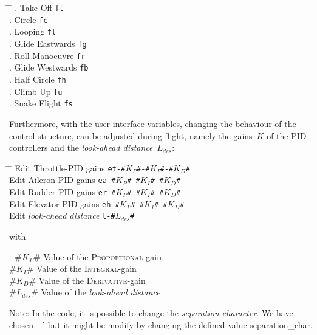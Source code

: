\documentclass[11pt,a4paper]{scrartcl}		%
\begin{document}
\begin{tabbing}
	\hspace{2cm} \= \hspace{4cm} \= \hspace{3cm} \kill
	. Take Off \> \texttt{ft} \\	
	. Circle \> \texttt{fc} \\	
	. Looping\> \texttt{fl} \\	
	. Glide Eastwards \> \texttt{fg} \\
	. Roll Manoeuvre \> \texttt{fr} \\		
	. Glide Westwards \> \texttt{fb} \\	
	. Half Circle \> \texttt{fh} \\	
	. Climb Up \> \texttt{fu} \\	
	. Snake Flight \> \texttt{fs} \\		
\end{tabbing}



\medskip

Furthermore, with the user interface variables, changing the behaviour of the control structure, can be adjusted during flight, namely the gains~$K$ of the PID-controllers and the \textsl{look-ahead distance}~$L_{des}$:

\begin{tabbing}
	\hspace{2cm} \= \hspace{6cm} \= \hspace{7cm} \kill
	\> Edit Throttle-PID gains \> \texttt{et-\#$K_P$\#-\#$K_I$\#-\#$K_D$\#} \\
	\> Edit Aileron-PID gains \> \texttt{ea-\#$K_P$\#-\#$K_I$\#-\#$K_D$\#} \\
	\> Edit Rudder-PID gains \> \texttt{er-\#$K_P$\#-\#$K_I$\#-\#$K_D$\#} \\
	\> Edit Elevator-PID gains \> \texttt{eh-\#$K_P$\#-\#$K_I$\#-\#$K_D$\#} \\
	\> Edit \textsl{look-ahead distance} \> \texttt{l-\#$L_{des}$\#} 
\end{tabbing} 
with 
\begin{tabbing}
	\hspace{2cm} \= \hspace{3cm} \= \hspace{7cm} \kill
	\> \#$K_P$\# \> Value of the \textsc{Proportional}-gain \\
	\> \#$K_I$\# \> Value of the \textsc{Integral}-gain \\
	\> \#$K_D$\# \> Value of the \textsc{Derivative}-gain \\
	\> \#$L_{des}$\# \> Value of the \textsl{look-ahead distance} \\
\end{tabbing}
\noindent
Note: In the code, it is possible to change the \textsl{separation character}. We have chosen \texttt{\'-\'} but it might be modify by changing the defined value \textsf{separation\_char}.
\end{document}
